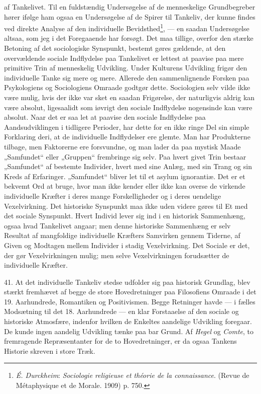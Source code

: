 \documentclass[12pt,a4paper]{book}
\newcommand{\apage}[1]{\marginnote{\footnotesize\textit{[#1]}}}
\begin{document}
af Tankelivet. Til en fuldstændig Undersøgelse af de menneskelige
Grundbegreber hører ifølge ham ogsaa en Undersøgelse af de Spirer til
Tankeliv, der kunne findes ved direkte Analyse af den individuelle
Bevidsthed\footnote{\emph{É. Durckheim}: \emph{Sociologie religieuse et
théorie de la connaissance}. (Revue de Métaphysique et de Morale. 1909)
p. 750.}, --- en saadan Undersøgelse altsaa, som jeg i det Foregaaende
har forsøgt. Det maa tillige, overfor den stærke Betoning af det
sociologiske Synspunkt, bestemt gøres gældende, at den overvældende
sociale Indflydelse paa Tankelivet er lettest at paavise paa mere
primitive Trin af menneskelig Udvikling. Under Kulturens Udvikling
frigør den individuelle Tanke sig mere og mere. Allerede den
sammenlignende Forsken paa Psykologiens og Sociologiens Omraade godtgør
dette. Sociologien selv vilde ikke være mulig, hvis der ikke var sket en
saadan Frigørelse, der naturligvis aldrig kan være absolut, ligesaalidt
som iøvrigt den sociale Indflydelse nogensinde kan være absolut. Naar
det er saa let at \apage{111} paavise den sociale Indflydelse paa Aandsudviklingen i
tidligere Perioder, har dette for en ikke ringe Del sin simple
Forklaring deri, at de individuelle Indflydelser ere glemte. Man har
Produkterne tilbage, men Faktorerne ere forsvundne, og man lader da paa
mystisk Maade „Samfundet“ eller „Gruppen“ frembringe sig selv. Paa hvert
givet Trin bestaar „Samfundet“ af bestemte Individer, hvert med sine
Anlæg, med sin Trang og sin Kreds af Erfaringer. „Samfundet“ bliver let
til et asylum ignorantiæ. Det er et bekvemt Ord at bruge, hvor man ikke
kender eller ikke kan overse de virkende individuelle Kræfter i deres
mange Forskelligheder og i deres uendelige Vexelvirkning. Det historiske
Synspunkt maa ikke uden videre gøres til Et med det sociale Synspunkt.
Hvert Individ lever sig ind i en historisk Sammenhæng, ogsaa hvad
Tankelivet angaar; men denne historiske Sammenhæng er selv Resultat af
mangfoldige individuelle Kræfters Samvirken gennem Tiderne, af Given og
Modtagen mellem Individer i stadig Vexelvirkning. Det Sociale er det, der
gør Vexelvirkningen mulig; men selve Vexelvirkningen forudsætter de
individuelle Kræfter.

41. At det individuelle Tankeliv stedse udfolder sig paa historisk
Grundlag, blev stærkt fremhævet af begge de store Hovedretninger paa
Filosofiens Omraade i det 19. Aarhundrede, Romantiken og Positivismen.
Begge Retninger havde --- i fælles Modsætning til det 18. Aarhundrede
--- en klar Forstaaelse af den sociale og historiske Atmosfære, indenfor
hvilken de Enkeltes aandelige Udvikling foregaar. De kunde ingen
aandelig Udvikling tænke paa bar Grund. Af \emph{Hegel} og \emph{Comte},
to fremragende Repræsentanter for de to Hovedretninger, er da ogsaa
Tankens Historie skreven i store Træk.
\end{document}
